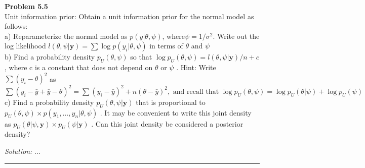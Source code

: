 \documentclass[a4paper, 11pt]{article}
\newenvironment{problem}[2][Problem]
    { \begin{mdframed}[backgroundcolor=gray!20] \textbf{#1 #2} \\}
    {  \end{mdframed}}
\newenvironment{solution}
    {\textit{Solution:}}
    {}
\begin{document}
\begin{problem}{5.5}
  Unit information prior: Obtain a unit information prior for the normal model as follows: \\
  a) Reparameterize the normal model as $ p(y | \theta, \psi)$, where$  \psi=1 / \sigma^{2} $.  Write  out the log likelihood $l(\theta, \psi | \boldsymbol{y})=\sum \log p\left(y_{i} | \theta, \psi\right)$ in terms of $ \theta$  and $ \psi $\\
  b) Find a probability density $ p_{U}(\theta, \psi)$ so that $ \log p_{U}(\theta, \psi)=l(\theta, \psi | \boldsymbol{y}) / n + c$,  where  c  is a constant that does not depend on $ \theta $ or $ \psi$ . Hint: Write $ \sum\left(y_{i}-\theta\right)^{2}$ as $ \sum\left(y_{i}-\bar{y}+\bar{y}-\theta\right)^{2}=\sum\left(y_{i}-\bar{y}\right)^{2}+n(\theta-\bar{y})^{2}, \text { and recall  that } \log p_{U}(\theta, \psi)=\log p_{U}(\theta | \psi)+\log p_{U}(\psi)$ \\
  c) Find a probability density $ p_{U}(\theta, \psi | \boldsymbol{y})$  that is proportional to $ p_{U}(\theta, \psi) \times  p\left(y_{1}, \ldots, y_{n} | \theta, \psi\right)$ . It may be convenient to write this joint density as $ p_{U}(\theta | \psi, \boldsymbol{y}) \times p_{U}(\psi | \boldsymbol{y})$  . Can this joint density be considered a posterior  density?
\end{problem}
\begin{solution}
...
\end{solution}

\noindent\rule{7in}{2.8pt}


\end{document}
